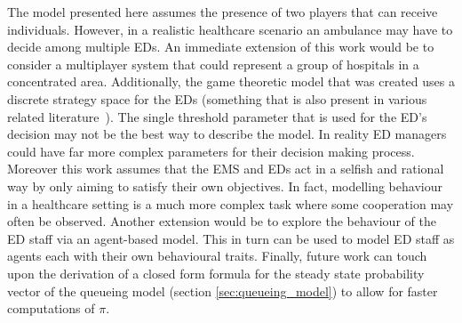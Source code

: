 The model presented here assumes the presence of two players that can receive
individuals.
However, in a realistic healthcare scenario an ambulance may have to decide
among multiple EDs.
An immediate extension of this work would be to consider a multiplayer system
that could represent a group of hospitals in a concentrated area.
Additionally, the game theoretic model that was created uses a discrete
strategy space for the EDs (something that is also present in various related
literature~\cite{deo2011centralized, knight2017measuring}).
The single threshold parameter that is used for the ED's decision may not be
the best way to describe the model.
In reality ED managers could have far more complex parameters for their
decision making process.
Moreover this work assumes that the EMS and EDs act in a selfish and rational
way by only aiming to satisfy their own objectives.
In fact, modelling behaviour in a healthcare setting is a much more complex
task where some cooperation may often be observed.
Another extension would be to explore the behaviour of the ED staff via an
agent-based model.
This in turn can be used to model ED staff as agents each with their own
behavioural traits.
Finally, future work can touch upon the derivation of a closed form formula for
the steady state probability vector of the queueing model
(section \ref{sec:queueing_model}) to allow for faster computations of \(\pi\).